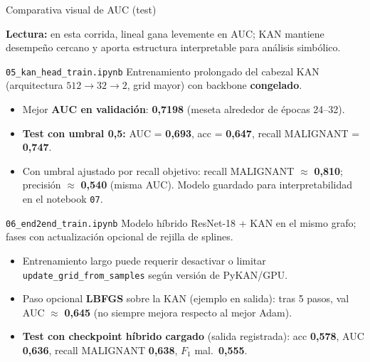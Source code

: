 \documentclass[aspectratio=169,spanish]{beamer}
\begin{document}
\begin{frame}{Comparativa visual de AUC (test)}
  \centering

  \vspace{0.6em}
  \small
  \textbf{Lectura:} en esta corrida, lineal gana levemente en AUC; KAN mantiene desempeño cercano y aporta estructura interpretable para análisis simbólico.
\end{frame}

\begin{frame}{\texttt{05\_kan\_head\_train.ipynb}}
  Entrenamiento prolongado del cabezal KAN (arquitectura $512\to32\to2$, grid mayor) con backbone \textbf{congelado}.
  \begin{itemize}
    \item Mejor \textbf{AUC en validación}: \textbf{0{,}7198} (meseta alrededor de épocas 24--32).
    \item \textbf{Test con umbral 0{,}5:} AUC = \textbf{0{,}693}, acc = \textbf{0{,}647}, recall MALIGNANT = \textbf{0{,}747}.
    \item Con umbral ajustado por recall objetivo: recall MALIGNANT $\approx$ \textbf{0{,}810}; precisión $\approx$ \textbf{0{,}540} (misma AUC). Modelo guardado para interpretabilidad en el notebook \texttt{07}.
  \end{itemize}
\end{frame}

\begin{frame}{\texttt{06\_end2end\_train.ipynb}}
  Modelo híbrido ResNet-18 + KAN en el mismo grafo; fases con actualización opcional de rejilla de splines.
  \begin{itemize}
    \item Entrenamiento largo puede requerir desactivar o limitar \texttt{update\_grid\_from\_samples} según versión de PyKAN/GPU.
    \item Paso opcional \textbf{LBFGS} sobre la KAN (ejemplo en salida): tras 5 pasos, val AUC $\approx$ \textbf{0{,}645} (no siempre mejora respecto al mejor Adam).
    \item \textbf{Test con checkpoint híbrido cargado} (salida registrada): acc \textbf{0{,}578}, AUC \textbf{0{,}636}, recall MALIGNANT \textbf{0{,}638}, $F_1$ mal.\ \textbf{0{,}555}.
  \end{itemize}
\end{frame}
\end{document}

